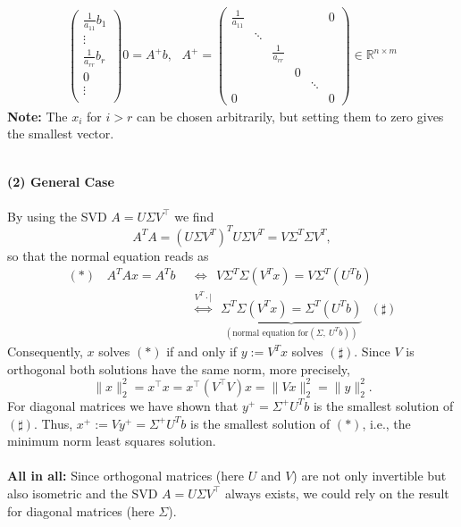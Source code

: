 {\begin{align*}
\begin{pmatrix}
	\frac{1}{a_{11}}b_1\\
	\vdots\\
	\frac{1}{a_{rr}}b_r\\
	0\\
	\vdots\\
	\end{pmatrix}
	0=A^+b,~~~A^+=\begin{pmatrix}
	\frac{1}{a_{11}}&~&~&~&~&0\\
	~&\ddots&~&~&~&~\\
	~&~&\frac{1}{a_{rr}}&~&~&~\\
	~&~&~&0&~&~\\
	~&~&~&~&\ddots&~\\
	0&~&~&~&~&0
	\end{pmatrix}\in\mathbb{R}^{n\times m}
	\end{align*}
	{\color{cyan}\textbf{Note:} The $x_i$ for $i>r$ can be chosen arbitrarily, but setting them to zero gives the smallest vector.}
	
~\\
	\textbf{(2) General Case}\\~\\
By using the SVD $A =U\Sigma V^\top$ we find
$$
A^TA=(U\Sigma V^T)^TU\Sigma V^T=V\Sigma^T\Sigma V^T,
$$
so that the normal equation reads as
\begin{align*}
(\ast)~~~~A^TAx=A^Tb~~&\Leftrightarrow~~V\Sigma^T\Sigma (V^Tx)=V\Sigma^T(U^Tb)\\
&\stackrel{V^T\cdot |}{\Leftrightarrow}~~
\underbrace{\Sigma^T\Sigma (V^Tx)=\Sigma^T(U^Tb)}_{(\text{normal equation for} (\Sigma,~U^Tb) )}~~~(\sharp)
\end{align*}
Consequently, $x$ solves $(\ast)$ if and only if $y:=V^Tx$ solves $(\sharp)$. Since $V$ is orthogonal both solutions have the same norm, more precisely,
$$\|x\|_2^2 = x^\top x = x^\top(V^\top V)x = \|Vx\|_2^2=\|y\|_2^2.$$
For diagonal matrices we have shown that $y^+=\Sigma^+U^Tb$ is the smallest solution of $(\sharp)$. Thus, $x^+ := Vy^+ = \Sigma^+U^Tb$ is the smallest solution of  $(\ast)$, i.e., the minimum norm least squares solution.\\~\\
\textbf{All in all:} Since orthogonal matrices (here $U$ and $V$) are not only invertible but also isometric and the SVD $A=U\Sigma V^\top$ always exists, we could rely on the result for diagonal matrices (here $\Sigma$).


}
